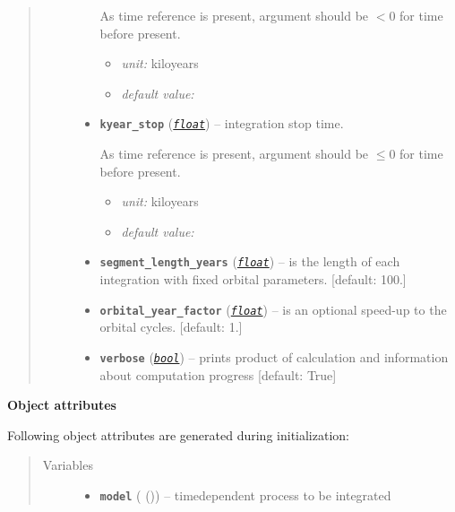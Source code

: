 \documentclass[a4paper,10pt,english]{sphinxmanual}
\begin{document}
\begin{fulllineitems}
\begin{quote}
\begin{description}
\begin{itemize}
As time reference
is present, argument should be \(<0\) 
for time before present.
\begin{itemize}
\item {} 
\emph{unit:} kiloyears

\item {} 
\emph{default value:} 

\end{itemize}


\item {} 
\textbf{\texttt{kyear\_stop}} (\href{http://docs.python.org/2.7/library/functions.html\#float}{\emph{\texttt{float}}}) -- 
integration stop time.

As time reference
is present, argument should be \(\le 0\) 
for time before present.
\begin{itemize}
\item {} 
\emph{unit:} kiloyears

\item {} 
\emph{default value:} 

\end{itemize}


\item {} 
\textbf{\texttt{segment\_length\_years}} (\href{http://docs.python.org/2.7/library/functions.html\#float}{\emph{\texttt{float}}}) -- is the length of each integration with
fixed orbital parameters. {[}default: 100.{]}

\item {} 
\textbf{\texttt{orbital\_year\_factor}} (\href{http://docs.python.org/2.7/library/functions.html\#float}{\emph{\texttt{float}}}) -- is an optional speed-up to the orbital cycles.
{[}default: 1.{]}

\item {} 
\textbf{\texttt{verbose}} (\href{http://docs.python.org/2.7/library/functions.html\#bool}{\emph{\texttt{bool}}}) -- prints product of calculation and
information about computation progress
{[}default: True{]}

\end{itemize}

\end{description}\end{quote}

\textbf{Object attributes}

Following object attributes are generated during initialization:
\begin{quote}\begin{description}
\item[{Variables}] \leavevmode\begin{itemize}
\item {} 
\textbf{\texttt{model}} ({\hyperref[api/climlab.process:climlab.process.time_dependent_process.TimeDependentProcess]{\emph{}}} ()) -- timedependent process to be integrated


\end{itemize}
\end{description}
\end{quote}
\end{fulllineitems}
\end{document}
